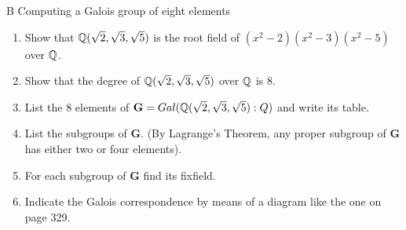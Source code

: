 \begin{exercise}{B Computing a Galois group of eight elements}
\begin{enumerate}
    \item Show that $\mathbb{Q}(\sqrt{2},\sqrt{3},\sqrt{5})$ is the root field of $(x^2-2)(x^2-3)(x^2-5)$ over $\mathbb{Q}$.
    \item Show that the degree of $\mathbb{Q}(\sqrt{2},\sqrt{3},\sqrt{5})$ over $\mathbb{Q}$ is 8.
    \item List the 8 elements of $\mathbf{G}=Gal(\mathbb{Q}(\sqrt{2},\sqrt{3},\sqrt{5}):Q)$ and write its table.
    \item List the subgroups of $\mathbf{G}$. (By Lagrange's Theorem, any proper subgroup of $\mathbf{G}$ has either two or four elements).
     \item For each subgroup of $\mathbf{G}$ find its fixfield.
     \item Indicate the Galois correspondence by means of a diagram like the one on page 329.
\end{enumerate}
\end{exercise}
